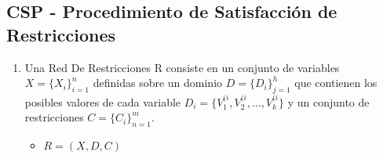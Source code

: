 \documentclass[12pt, twoside, openright]{report} %
\begin{document}
\subsection{CSP - Procedimiento de Satisfacción de Restricciones}

  \begin{enumerate}
  \def\labelenumi{\arabic{enumi}.}
  \item
    Una Red De Restricciones R consiste en un conjunto de variables
    \(X=\{ X_i \}^n_{i=1}\) definidas sobre un dominio
    \(D=\{ D_i \}^h_{j=1}\) que contienen los posibles valores de cada
    variable \(D_i=\{ V_1^{(i}, V_2^{(i}, ..., V_k^{(i} \}\) y un
    conjunto de restricciones \(C=\{ C_i \}^m_{n=1}\).

    \begin{itemize}
  
    \item
      \(R = (X, D, C)\)
    \end{itemize}
  \end{enumerate}
\end{document}
